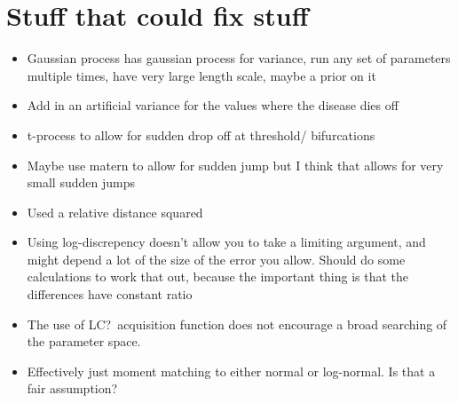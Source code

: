 \chapter{Stuff that could fix stuff}

\begin{itemize}
    \item Gaussian process has gaussian process for variance, run any set of parameters multiple times, have very large length scale, maybe a prior on it
    \item Add in an artificial variance for the values where the disease dies off
    \item t-process to allow for sudden drop off at threshold/ bifurcations
    \item Maybe use matern to allow for sudden jump but I think that allows for very small sudden jumps
    \item Used a relative distance squared
    \item Using log-discrepency doesn't allow you to take a limiting argument, and might depend a lot of the size of the error you allow. Should do some calculations to work that out, because the important thing is that the differences have constant ratio
    \item The use of LC?\ acquisition function does not encourage a broad searching of the parameter space.
    \item Effectively just moment matching to either normal or log-normal. Is that a fair assumption?
\end{itemize}